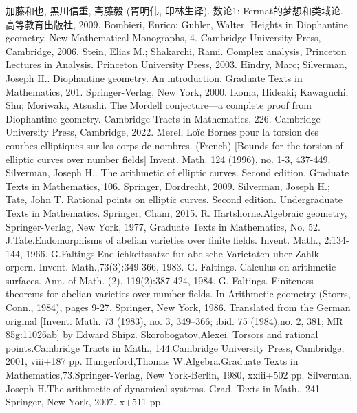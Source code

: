 \documentclass[11pt]{ctexart}
\begin{document}
\begin{thebibliography}{100}
     加藤和也, 黑川信重, 斋藤毅 (胥明伟, 印林生译). 数论1: Fermat的梦想和类域论. 高等教育出版社, 2009. 
     Bombieri, Enrico; Gubler, Walter. Heights in Diophantine geometry. New Mathematical Monographs, 4. Cambridge University Press, Cambridge, 2006.
     Stein, Elias M.; Shakarchi, Rami. Complex analysis, Princeton Lectures in Analysis. Princeton University Press, 2003.
     Hindry, Marc; Silverman, Joseph H.. Diophantine geometry. An introduction. Graduate Texts in Mathematics, 201. Springer-Verlag, New York, 2000.
     Ikoma, Hideaki; Kawaguchi, Shu; Moriwaki, Atsushi. The Mordell conjecture—a complete proof from Diophantine geometry. Cambridge Tracts in Mathematics, 226. Cambridge University Press, Cambridge, 2022.
     Merel, Loïc Bornes pour la torsion des courbes elliptiques sur les corps de nombres. (French) [Bounds for the torsion of elliptic curves over number fields] Invent. Math. 124 (1996), no. 1-3, 437-449.
     Silverman, Joseph H.. The arithmetic of elliptic curves. Second edition. Graduate Texts in Mathematics, 106. Springer, Dordrecht, 2009.
    Silverman, Joseph H.; Tate, John T. Rational points on elliptic curves. Second edition. Undergraduate Texts in Mathematics. Springer, Cham, 2015.
    R. Hartshorne.Algebraic geometry, Springer-Verlag, New York, 1977, Graduate Texts in Mathematics, No. 52.
    J.Tate.Endomorphisms of abelian varieties over finite fields. Invent. Math., 2:134-144, 1966.
    G.Faltings.Endlichkeitssatze fur abelsche Varietaten uber Zahlk orpern. Invent. Math.,73(3):349-366, 1983.
    G. Faltings. Calculus on arithmetic surfaces. Ann. of Math. (2), 119(2):387-424, 1984.
    G. Faltings. Finiteness theorems for abelian varieties over number fields. In Arithmetic geometry (Storrs, Conn., 1984), pages 9-27. Springer, New York, 1986. Tra\textup{ns}lated from the German original [Invent. Math. 73 (1983), no. 3, 349–366; ibid. 75 (1984),no. 2, 381; MR 85g:11026ab] by Edward Shipz.
    Skorobogatov,Alexei. Torsors and rational points.Cambridge Tracts in Math., 144.Cambridge University Press, Cambridge, 2001, viii+187 pp.
    Hungerford,Thomas W.Algebra.Graduate Texts in Mathematics,73.Springer-Verlag, New York-Berlin, 1980, xxiii+502 pp.
    Silverman, Joseph H.The arithmetic of dynamical systems. Grad. Texts in Math., 241 Springer, New York, 2007. x+511 pp.

\end{thebibliography}
\end{document}
